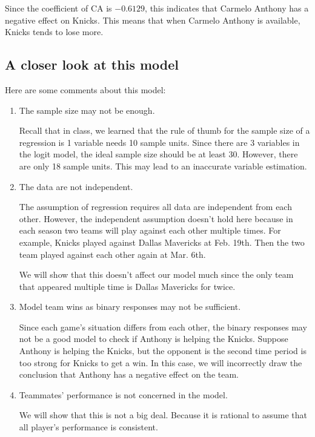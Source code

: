 \documentclass[12pt]{article}
\begin{document}
Since the coefficient of CA is  $-0.6129$, this indicates that Carmelo
Anthony has a negative effect on Knicks. This means that when Carmelo
Anthony is available, Knicks tends to lose more.

\subsection{A closer look at this model}

Here are some comments about this model:

\begin{enumerate}
  \item The sample size may not be enough.

    Recall that in class, we learned that the rule of thumb for the
    sample size of a regression is 1 variable needs 10 sample
    units. Since there are 3 variables in the logit model, the ideal
    sample size should be at least 30. However, there are only 18
    sample units. This may lead to an inaccurate variable estimation.

  \item The data are not independent.

    The assumption of regression requires all data are independent
    from each other. However, the independent assumption doesn't hold
    here because in each season two teams will play against each other
    multiple times. For example, Knicks played against Dallas
    Mavericks at Feb. 19th. Then the two team played against each
    other again at Mar. 6th.

    We will show that this doesn't affect our model much since the
    only team that appeared multiple time is Dallas Mavericks for
    twice.

  \item Model team wins as binary responses may not be sufficient.
    
    Since each game's situation differs from each other, the binary
    responses may not be a good model to check if Anthony is helping
    the Knicks. Suppose Anthony is helping the Knicks, but the
    opponent is the second time period is too strong for Knicks to get
    a win. In this case, we will incorrectly draw the conclusion that
    Anthony has a negative effect on the team.

  \item Teammates' performance is not concerned in the model.

    We will show that this is not a big deal. Because it is rational
    to assume that all player's performance is consistent.

\end{enumerate}
\end{document}
